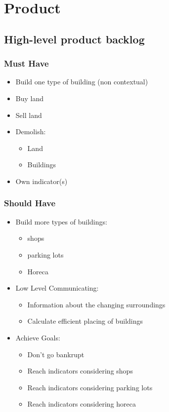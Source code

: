 \label{product}
\section{Product}

\subsection{High-level product backlog}

\subsubsection{Must Have}
\begin{itemize}
	\item Build one type of building (non contextual)
	\item Buy land
	\item Sell land
	\item Demolish:
		\begin{itemize}
			\item Land
			\item Buildings
		\end{itemize}
	\item Own indicator(s)
\end{itemize}

\subsubsection{Should Have}
\begin{itemize}
	\item Build more types of buildings:
	\begin{itemize}
		\item shops
		\item parking lots
		\item Horeca
	\end{itemize}
	\item Low Level Communicating:
	\begin{itemize}
		\item Information about the changing surroundings
		\item Calculate efficient placing of buildings
	\end{itemize}
	\item Achieve Goals:
	\begin{itemize}
		\item Don’t go bankrupt
		\item Reach indicators considering shops
		\item Reach indicators considering parking lots
		\item Reach indicators considering horeca
	\end{itemize}
\end{itemize}

